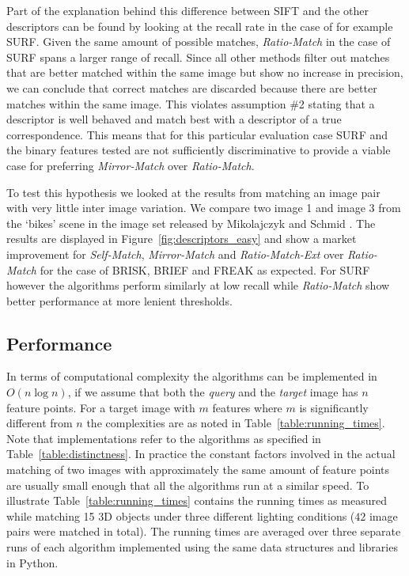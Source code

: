 \documentclass[journal]{IEEEtran}
\begin{document}
Part of the explanation behind this difference between SIFT and the 
other descriptors can be found by looking at the recall rate in the case
of for example SURF\@. Given the same amount of possible matches, 
\emph{Ratio-Match} in the case of SURF spans a larger range of recall.  
Since all other methods filter out matches that are better matched 
within the same image but show no increase in precision, we can conclude 
that correct matches are discarded because there are better matches 
within the same image. This violates assumption \#2 stating that a 
descriptor is well behaved and match best with a descriptor of a true 
correspondence. This means that for this particular evaluation case SURF 
and the binary features tested are not sufficiently discriminative to 
provide a viable case for preferring \emph{Mirror-Match} over 
\emph{Ratio-Match}.

To test this hypothesis we looked at the results from matching an image 
pair with very little inter image variation. We compare two image 1 and 
image 3 from the `bikes' scene in the image set released by Mikolajczyk 
and Schmid \cite{mikolajczyk2005performance}. The results are displayed 
in Figure~\ref{fig:descriptors_easy} and show a market improvement for 
\emph{Self-Match}, \emph{Mirror-Match} and \emph{Ratio-Match-Ext} over 
\emph{Ratio-Match} for the case of BRISK, BRIEF and FREAK as expected.  
For SURF however the algorithms perform similarly at low recall while 
\emph{Ratio-Match} show better performance at more lenient thresholds.

\subsection{Performance}

In terms of computational complexity the algorithms can be implemented 
in $O(n\log n)$, if we assume that both the \emph{query} and the 
\emph{target} image has $n$ feature points. For a target image with $m$ 
features where $m$ is significantly different from $n$ the complexities 
are as noted in Table~\ref{table:running_times}. Note that 
implementations refer to the algorithms as specified in 
Table~\ref{table:distinctness}. In practice the constant factors 
involved in the actual matching of two images with approximately the 
same amount of feature points are usually small enough that all the 
algorithms run at a similar speed. To illustrate 
Table~\ref{table:running_times} contains the running times as measured 
while matching 15 3D objects under three different lighting conditions 
($42$ image pairs were matched in total). The running times are averaged 
over three separate runs of each algorithm implemented using the same 
data structures and libraries in Python. 
\end{document}
